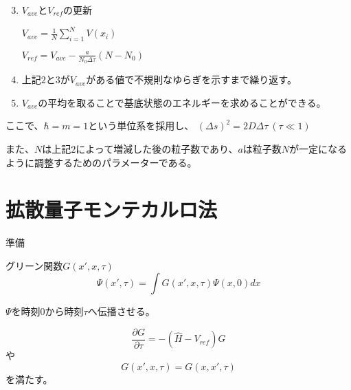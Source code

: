 \documentclass[dvipdfmx]{beamer}
\begin{document}
    \begin{frame}
        \begin{enumerate}
            \setcounter{enumi}{2}
            \item $V_{ave}$と$V_{ref}$の更新

            $V_{ave} = \frac{1}{N}\sum_{i=1}^{N}V(x_i)$

            $V_{ref} = V_{ave} - \frac{a}{N_0\Delta\tau}(N-N_0)$

            \item 上記$2$と$3$が$V_{ave}$がある値で不規則なゆらぎを示すまで繰り返す。

            \item $V_{ave}$の平均を取ることで基底状態のエネルギーを求めることができる。
        \end{enumerate}
        ここで、$\hbar = m = 1$という単位系を採用し、
        $(\Delta s)^2 = 2D\Delta \tau~(\tau \ll 1)$

        また、$N$は上記$2$によって増減した後の粒子数であり、$a$は粒子数$N$が一定になるように調整するためのパラメーターである。
    \end{frame}

    \section{拡散量子モンテカルロ法}
    \begin{frame}{準備}
        \begin{block}{グリーン関数$G(x',x,\tau)$}
            \begin{equation}
                \Psi(x',\tau) = \int G(x',x,\tau)\Psi(x,0)dx
            \end{equation}
        \end{block}

        $\Psi$を時刻$0$から時刻$\tau$へ伝播させる。

        \begin{equation}
            \label{tmp2}
            \dfrac{\partial G}{\partial \tau} = -(\hat{H} - V_{ref})G
        \end{equation}
        や
        \begin{equation}
            G(x',x,\tau) = G(x,x',\tau)
        \end{equation}
        を満たす。
    \end{frame}
\end{document}
